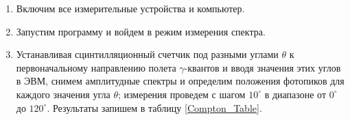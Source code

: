 \documentclass[12pt,a4paper]{article}
\begin{document}
    \begin{enumerate}
		\item Включим все измерительные устройства и компьютер.
		
		\item Запустим программу и войдем в режим измерения спектра.
		
		\item Устанавливая сцинтилляционный счетчик под разными углами $\theta$ к первоначальному направлению полета $\gamma$-квантов и вводя значения этих углов в ЭВМ, снимем амплитудные спектры и определим положения фотопиков для каждого значения угла $\theta$; измерения проведем с шагом $10^\circ$ в диапазоне от $0^\circ$ до $120^\circ$. Результаты запишем в таблицу \ref{Compton_Table}.
	\end{enumerate}
	
\end{document}
